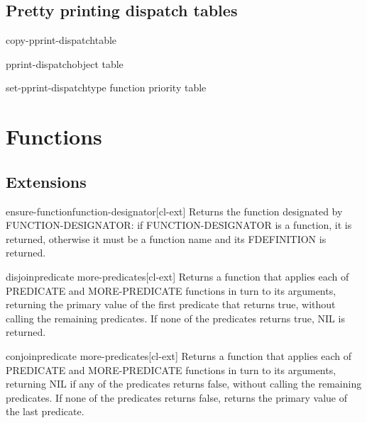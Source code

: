 \documentclass[10pt,english]{book}
\begin{document}
\section{Pretty printing dispatch tables}
\label{sec:pretty-print-disp}

\begin{function}{copy-pprint-dispatch}{\op table}
  
\end{function}

\begin{function}{pprint-dispatch}{object \op table}
  
\end{function}

\begin{function}{set-pprint-dispatch}{type function \op priority table}
  
\end{function}


\chapter{Functions}

\section{Extensions}
\label{sec:fun-extensions}

\begin{function}{ensure-function}{function-designator}[cl-ext]
  Returns the function designated by FUNCTION-DESIGNATOR:
if FUNCTION-DESIGNATOR is a function, it is returned, otherwise
it must be a function name and its FDEFINITION is returned.
\end{function}

\begin{function}{disjoin}{predicate \rest more-predicates}[cl-ext]
  Returns a function that applies each of PREDICATE and MORE-PREDICATE
functions in turn to its arguments, returning the primary value of the first
predicate that returns true, without calling the remaining predicates.
If none of the predicates returns true, NIL is returned.
\end{function}

\begin{function}{conjoin}{predicate \rest more-predicates}[cl-ext]
  Returns a function that applies each of PREDICATE and MORE-PREDICATE
functions in turn to its arguments, returning NIL if any of the predicates
returns false, without calling the remaining predicates. If none of the
predicates returns false, returns the primary value of the last predicate.
\end{function}
\end{document}
